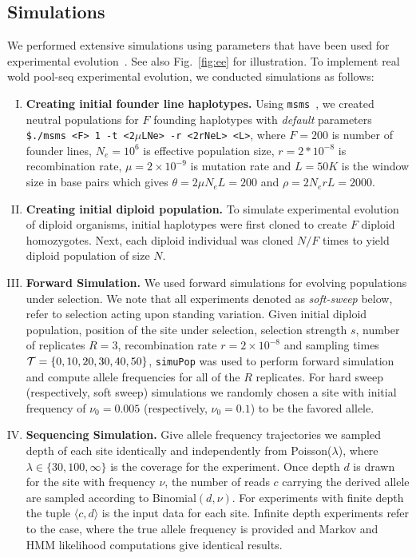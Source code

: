 \subsection{Simulations}
We performed extensive simulations using parameters that have been
used for \dmel experimental
evolution~\cite{kofler2013guide}. See also Fig.~\ref{fig:ee} for
illustration. To implement real wold pool-seq experimental evolution, we 
conducted simulations as follows:
\begin{enumerate}[I.]
\item {\bf Creating initial founder line haplotypes.} Using
  \texttt{msms}~\cite{ewing2010msms}, we created neutral populations for $F$
  founding haplotypes with \emph{default} parameters \texttt{\$./msms
    <F> 1 -t <2$\mu$LNe> -r <2rNeL> <L>}, where $F=200$ is number of
  founder lines, $N_e=10^6$ is effective population size,
  $r=2*10^{-8}$ is recombination rate, $\mu=2\times 10^{-9}$ is
  mutation rate and $L=50K$ is the window size in base pairs which
  gives $\theta=2\mu N_eL=200$ and $\rho=2N_erL=2000$.
  
\item{\bf Creating initial diploid population.} To simulate
  experimental evolution of diploid organisms, initial haplotypes were
  first cloned to create $F$ diploid homozygotes. Next, each diploid
  individual was cloned $N/F$ times to yield diploid population of
  size $N$.

\item{\bf Forward Simulation.} We used forward simulations for
  evolving populations under selection. We note that all experiments
  denoted as \emph{soft-sweep} below, refer to selection acting upon
  standing variation. Given initial diploid population, position of
  the site under selection, selection strength $s$, number of
  replicates $R=3$, recombination rate $r=2\times10^{-8}$ and sampling
  times ${\cal T}=\{0,10,20,30,40,50\}$, \texttt{simuPop} was used to
  perform forward simulation and compute allele frequencies for all of
  the $R$ replicates.  For hard sweep (respectively, soft sweep)
  simulations we randomly chosen a site with initial frequency of
  $\nu_0=0.005$ (respectively, $\nu_0=0.1$) to be the favored allele.
\item{\bf Sequencing Simulation.} Give allele frequency trajectories
  we sampled depth of each site identically and independently from
  Poisson($\lambda$), where $\lambda \in \{30,100,\infty\}$ is the
  coverage for the experiment. Once depth $d$ is drawn for the site
  with frequency $\nu$, the number of reads $c$ carrying the derived
  allele are sampled according to Binomial$(d,\nu)$. For experiments
  with finite depth the tuple $\langle c,d\rangle$ is the input data
  for each site. Infinite depth experiments refer to the case, where
  the true allele frequency is provided and Markov and HMM likelihood
  computations give identical results.
\end{enumerate}
